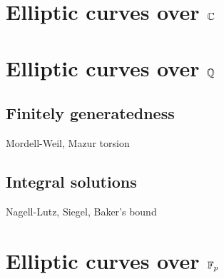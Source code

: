 \documentclass{../note}
\begin{document}
\chapter{Elliptic curves over $\mathbb{C}$}
\chapter{Elliptic curves over $\mathbb{Q}$}
\section{Finitely generatedness}
Mordell-Weil, Mazur torsion
\section{Integral solutions}
Nagell-Lutz, Siegel, Baker's bound
\chapter{Elliptic curves over $\mathbb{F}_p$}
\end{document}
